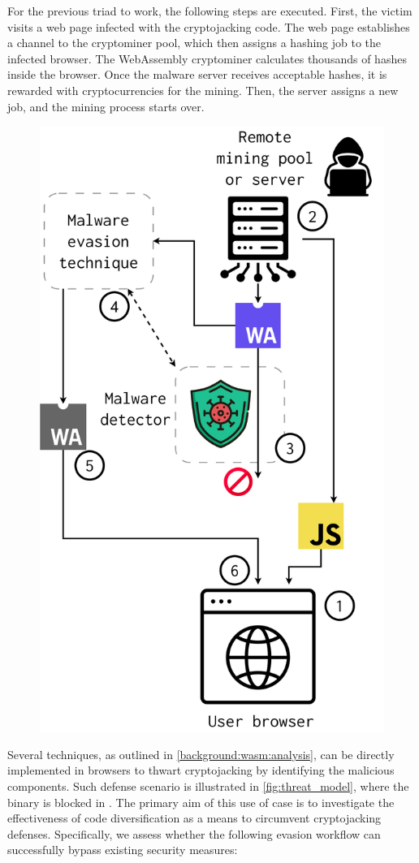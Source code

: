 For the previous triad to work, the following steps are executed.
First, the victim visits a web page infected with the cryptojacking code. 
The web page establishes a channel to the cryptominer pool, which then assigns a hashing job to the infected browser. 
The WebAssembly cryptominer calculates thousands of hashes inside the browser. 
Once the malware server receives acceptable hashes, it is rewarded with cryptocurrencies for the mining. 
Then, the server assigns a new job, and the mining process starts over.

\begin{figure}
    \centering
    \includegraphics[width=0.4\linewidth]{figures/threat_model.pdf}
    \caption{}
    \label{fig:threat_model}
\end{figure}






Several techniques, as outlined in \autoref{background:wasm:analysis}, can be directly implemented in browsers to thwart cryptojacking by identifying the malicious \Wasm components. 
Such defense scenario is illustrated in \autoref{fig:threat_model}, where the \Wasm binary is blocked in .
The primary aim of this use of case is to investigate the effectiveness of code diversification as a means to circumvent cryptojacking defenses. 
Specifically, we assess whether the following evasion workflow can successfully bypass existing security measures:

